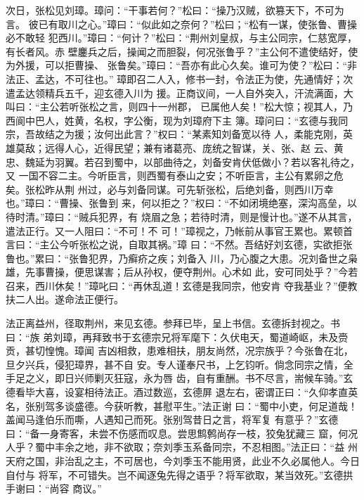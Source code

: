 次日，张松见刘璋。璋问：“干事若何？”松曰：“操乃汉贼，欲篡天下，不可为言。
彼已有取川之心。”璋曰：“似此如之奈何？”松曰；“松有一谋，使张鲁、曹操必不敢轻
犯西川。”璋曰：“何计？”松曰：“荆州刘皇叔，与主公同宗，仁慈宽厚，有长者风。赤
壁鏖兵之后，操闻之而胆裂，何况张鲁乎？”主公何不遣使结好，使为外援，可以拒曹操、
张鲁矣。”璋曰：“吾亦有此心久矣。谁可为使？”松曰：“非法正、孟达，不可往也。”
璋即召二人入，修书一封，令法正为使，先通情好；次遣孟达领精兵五千，迎玄德入川为
援。正商议间，一人自外突入，汗流满面，大叫曰：“主公若听张松之言，则四十一州郡，
已属他人矣！”松大惊；视其人，乃西阆中巴人，姓黄，名权，字公衡，现为刘璋府下主
簿。璋问曰：“玄德与我同宗，吾故结之为援；汝何出此言？”权曰：“某素知刘备宽以待
人，柔能克刚，英雄莫敌；远得人心，近得民望；兼有诸葛亮、庞统之智谋，关、张、赵
云、黄忠、魏延为羽翼。若召到蜀中，以部曲待之，刘备安肯伏低做小？若以客礼待之，又
一国不容二主。今听臣言，则西蜀有泰山之安；不听臣言，主公有累卵之危矣。张松昨从荆
州过，必与刘备同谋。可先斩张松，后绝刘备，则西川万幸也。”璋曰：“曹操、张鲁到
来，何以拒之？”权曰：“不如闭境绝塞，深沟高垒，以待时清。”璋曰：“贼兵犯界，有
烧眉之急；若待时清，则是慢计也。”遂不从其言，遣法正行。又一人阻曰：“不可！不
可！”璋视之，乃帐前从事官王累也。累顿首言曰：“主公今听张松之说，自取其祸。”璋
曰：“不然。吾结好刘玄德，实欲拒张鲁也。”累曰：“张鲁犯界，乃癣疥之疾；刘备入
川，乃心腹之大患。况刘备世之枭雄，先事曹操，便思谋害；后从孙权，便夺荆州。心术如
此，安可同处乎？”今若召来，西川休矣！”璋叱曰：“再休乱道！玄德是我同宗，他安肯
夺我基业？”便教扶二人出。遂命法正便行。

法正离益州，径取荆州，来见玄德。参拜已毕，呈上书信。玄德拆封视之。书曰：“族
弟刘璋，再拜致书于玄德宗兄将军麾下：久伏电天，蜀道崎岖，未及赍贡，甚切惶愧。璋闻
吉凶相救，患难相扶，朋友尚然，况宗族乎？今张鲁在北，旦夕兴兵，侵犯璋界，甚不自
安。专人谨奉尺书，上乞钧听。倘念同宗之情，全手足之义，即日兴师剿灭狂寇，永为唇
齿，自有重酬。书不尽言，耑候车骑。”玄德看毕大喜，设宴相待法正。酒过数巡，玄德屏
退左右，密谓正曰：“久仰孝直英名，张别驾多谈盛德。今获听教，甚慰平生。”法正谢
曰：“蜀中小吏，何足道哉！盖闻马逢伯乐而嘶，人遇知己而死。张别驾昔日之言，将军复
有意乎？”玄德曰：“备一身寄客，未尝不伤感而叹息。尝思鹪鹩尚存一枝，狡兔犹藏三
窟，何况人乎？蜀中丰余之地，非不欲取；奈刘季玉系备同宗，不忍相图。”法正曰：“益
州天府之国，非治乱之主，不可居也，今刘季玉不能用贤，此业不久必属他人。今日自付与
将军，不可错失。岂不闻逐兔先得之语乎？将军欲取，某当效死。”玄德拱手谢曰：“尚容
商议。”

